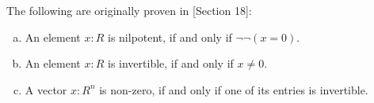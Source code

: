 The following are originally proven in 
\cite{blechschmidt-thesis}[Section 18]:

\begin{proposition}%
  \label{nilpotence-double-negation}\label{non-zero-invertible}\label{generalized-field-property}
  
  \begin{enumerate}[(a)]
  \item An element $x:R$ is nilpotent,
    if and only if $\neg \neg (x=0)$.
  \item An element $x:R$ is invertible,
    if and only if $x\neq 0$.
  \item A vector $x:R^n$ is non-zero,
    if and only if one of its entries is invertible.
  \end{enumerate}
\end{proposition}
